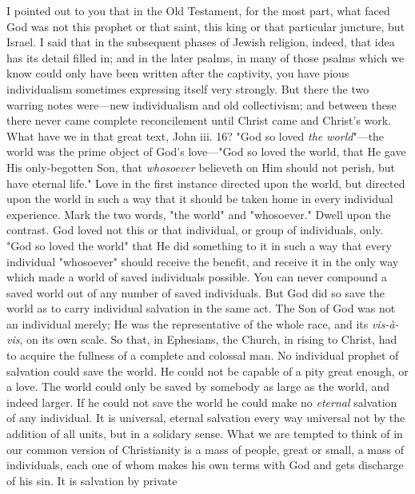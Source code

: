 \documentclass[12pt,a5paper,twoside,titlepage]{book}
\begin{document}
I pointed out to you that in the Old Testament, 
for the most part, what faced God was not 
this prophet or that saint, this king or that particular 
juncture, but Israel. I said that in the 
subsequent phases of Jewish religion, indeed, 
that idea has its detail filled in; and in the later 
psalms, in many of those psalms which we know 
could only have been written after the captivity, 
you have pious individualism sometimes expressing 
itself very strongly. But there the two warring 
notes were---new individualism and old collectivism; 
and between these there never came 
complete reconcilement until Christ came and 
Christ's work. What have we in that great text, 
John iii. 16? "God so loved \textit{the world}"---the world 
was the prime object of God's love---"God so 
loved the world, that He gave His only-begotten 
Son, that \textit{whosoever} believeth on Him should not 
perish, but have eternal life." Love in the first 
instance directed upon the world, but directed 
upon the world in such a way that it should be 
taken home in every individual experience. 
Mark the two words, "the world" and "whosoever." 
Dwell upon the contrast. God loved 
not this or that individual, or group of individuals, 
only. "God so loved the world" that 
He did something to it in such a way that every 
individual "whosoever" should receive the benefit, 
and receive it in the only way which made 
a world of saved individuals possible. You can 
never compound a saved world out of any 
number of saved individuals. But God did so 
save the world as to carry individual salvation 
in the same act. The Son of God was not an 
individual merely; He was the representative of 
the whole race, and its \textit{vis-\`{a}-vis}, on its own scale. 
So that, in Ephesians, the Church, in rising to 
Christ, had to acquire the fullness of a complete 
and colossal man. No individual prophet of salvation 
could save the world. He could not be 
capable of a pity great enough, or a love. The 
world could only be saved by somebody as large 
as the world, and indeed larger. If he could 
not save the world he could make no \textit{eternal} 
salvation of any individual. It is universal, 
eternal salvation every way universal not by 
the addition of all units, but in a solidary sense. 
What we are tempted to think of in our common 
version of Christianity is a mass of people, great 
or small, a mass of individuals, each one of 
whom makes his own terms with God and gets 
discharge of his sin. It is salvation by private 
\end{document}
